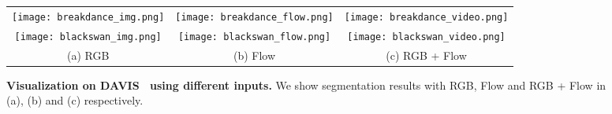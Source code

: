 \documentclass[twocolumn]{article}
\begin{document}
\begin{figure}[!t]
\centering
\begin{tabular}{c@{\hskip 3pt}c@{\hskip 3pt}c}

        \texttt{[image: breakdance\_img.png]} &
        \texttt{[image: breakdance\_flow.png]}&
        \texttt{[image: breakdance\_video.png]} \\	
        
         \texttt{[image: blackswan\_img.png]} &
        \texttt{[image: blackswan\_flow.png]}&
        \texttt{[image: blackswan\_video.png]} \\	
        
		
        (a) RGB & (b) Flow & (c) RGB + Flow \\ 
\end{tabular}
\caption{\textbf{Visualization on DAVIS~\cite{perazzi2016benchmark} using different inputs.} We show segmentation results with RGB, Flow and RGB + Flow  in (a), (b) and (c) respectively.}
\label{fig: diff_inputs}
\end{figure}
\end{document}
